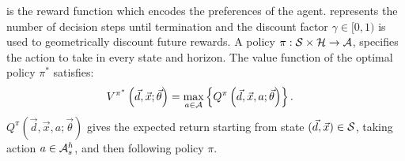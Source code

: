 {\footnotesize \RewardFunc} is the reward function which encodes the preferences of the agent. {\footnotesize \Horizon} represents the number of decision steps until termination and the discount factor {\footnotesize $\gamma \in [0, 1)$} is used to geometrically discount future rewards. A policy {\footnotesize $\pi : \mathcal{S} \times \mathcal{H} \rightarrow \mathcal{A}$}, specifies the action to take in every state and horizon. The value function of the optimal policy {\footnotesize$ \pi^{*} $} satisfies:
{\footnotesize 
    \abovedisplayskip=0pt
    \belowdisplayskip=0pt
    \begin{align}
        \label{eq:opt_vfunc}
        V^{\pi^{*}}\left(\vec{d}, \vec{x}; \vec{\theta}\right) &= \max_{a \in \mathcal{A}} \left\{ Q^{\pi}\left(\vec{d}, \vec{x}, a; \vec{\theta}\right) \right\}.
    \end{align}
}%
{\footnotesize $ Q^{\pi}\left(\vec{d}, \vec{x}, a; \vec{\theta}\right) $} gives the expected return starting from state {\footnotesize $(\vec{d}, \vec{x}) \in \mathcal{S}$}, taking action {\footnotesize $ a \in \mathcal{A}^{h}_{s} $}, and then following policy $ \pi $.


%

